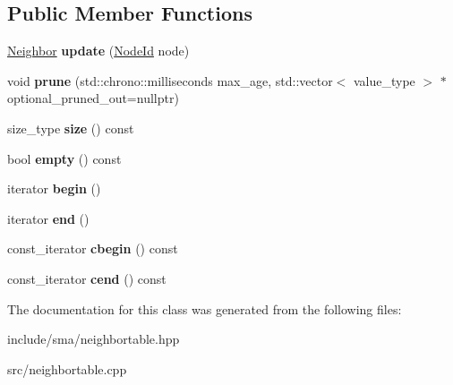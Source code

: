 \subsection*{Public Member Functions}
\begin{DoxyCompactItemize}
\item 
\hypertarget{classsma_1_1NeighborTable_aab743ad677e50024ea361c2d71f03e9d}{\hyperlink{structsma_1_1Neighbor}{Neighbor} {\bfseries update} (\hyperlink{structsma_1_1NodeId}{Node\-Id} node)}\label{classsma_1_1NeighborTable_aab743ad677e50024ea361c2d71f03e9d}

\item 
\hypertarget{classsma_1_1NeighborTable_a9b7d314dece28e3036162ba55af82c6b}{void {\bfseries prune} (std\-::chrono\-::milliseconds max\-\_\-age, std\-::vector$<$ value\-\_\-type $>$ $\ast$optional\-\_\-pruned\-\_\-out=nullptr)}\label{classsma_1_1NeighborTable_a9b7d314dece28e3036162ba55af82c6b}

\item 
\hypertarget{classsma_1_1NeighborTable_ab81c16e2a0ab5a20021a463a5e2f23ee}{size\-\_\-type {\bfseries size} () const }\label{classsma_1_1NeighborTable_ab81c16e2a0ab5a20021a463a5e2f23ee}

\item 
\hypertarget{classsma_1_1NeighborTable_af15c63b21b2dbd50605f397010d2aa51}{bool {\bfseries empty} () const }\label{classsma_1_1NeighborTable_af15c63b21b2dbd50605f397010d2aa51}

\item 
\hypertarget{classsma_1_1NeighborTable_a75ccee9fcdc5672ddd62a203cb997b83}{iterator {\bfseries begin} ()}\label{classsma_1_1NeighborTable_a75ccee9fcdc5672ddd62a203cb997b83}

\item 
\hypertarget{classsma_1_1NeighborTable_aa3ee1e004c5000adde847f26652cb7f5}{iterator {\bfseries end} ()}\label{classsma_1_1NeighborTable_aa3ee1e004c5000adde847f26652cb7f5}

\item 
\hypertarget{classsma_1_1NeighborTable_ae65f184f456941cf5b1124a59d32ae87}{const\-\_\-iterator {\bfseries cbegin} () const }\label{classsma_1_1NeighborTable_ae65f184f456941cf5b1124a59d32ae87}

\item 
\hypertarget{classsma_1_1NeighborTable_a8d9588e4d14bd5c8dcf1f9c3ca0c83da}{const\-\_\-iterator {\bfseries cend} () const }\label{classsma_1_1NeighborTable_a8d9588e4d14bd5c8dcf1f9c3ca0c83da}

\end{DoxyCompactItemize}


The documentation for this class was generated from the following files\-:\begin{DoxyCompactItemize}
\item 
include/sma/neighbortable.\-hpp\item 
src/neighbortable.\-cpp\end{DoxyCompactItemize}
